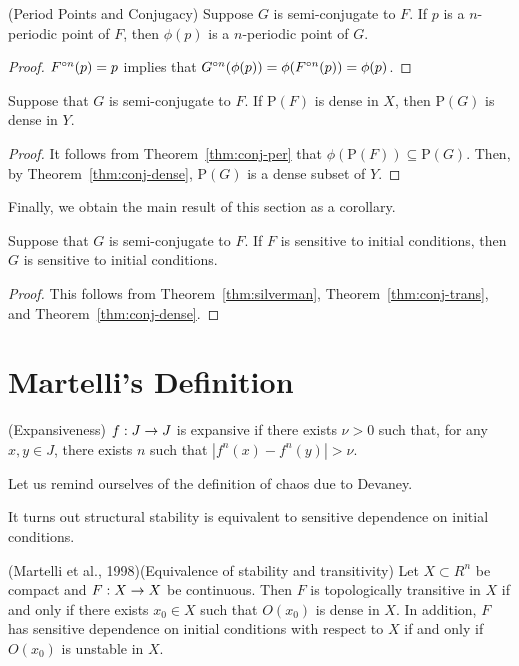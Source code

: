 \documentclass[12pt,draft,twoside]{book}
\begin{document}
  \begin{lemma}
    (Period Points and Conjugacy)
    Suppose $G$ is semi-conjugate to $F$.
    If $p$ is a $n$-periodic point of $F$, then $\phi(p)$ is a $n$-periodic point of $G$.
    \label{thm:conj-per}
    \begin{proof}
      $F^{\circ n}(p) = p$ implies that $G^{\circ n}(\phi(p)) = \phi(F^{\circ n}(p)) = \phi(p)$.
    \end{proof}
  \end{lemma}
\begin{theorem}
    Suppose that $G$ is semi-conjugate to $F$.
    If $\mathrm{P}(F)$ is dense in $X$, then $\mathrm{P}(G)$ is dense in $Y$.
    \label{cor:conj-dense-per}
    \begin{proof}
      It follows from Theorem~\ref{thm:conj-per} that $\phi(\mathrm{P}(F)) \subseteq \mathrm{P}(G)$.
      Then, by Theorem~\ref{thm:conj-dense}, $\mathrm{P}(G)$ is a dense subset of $Y$.
    \end{proof}
\end{theorem}
Finally, we obtain the main result of this section as a corollary.
\begin{corollary}
  Suppose that $G$ is semi-conjugate to $F$.
  If $F$ is sensitive to initial conditions, then $G$ is sensitive to initial conditions.
  \label{cor:conj-sdic}
  \begin{proof}
  This follows from Theorem~\ref{thm:silverman}, Theorem~\ref{thm:conj-trans}, and Theorem~\ref{thm:conj-dense}.
  \end{proof}
\end{corollary}

\section{Martelli's Definition}

\begin{definition}
  (Expansiveness) $f: J\rightarrow J$ is expansive if there exists $\nu > 0$
  such that, for any $x,y\in J$, there exists $n$ such that
  $|f^{n}(x)-f^{n}(y)| > \nu$.
\end{definition}

Let us remind ourselves of the definition of chaos due to Devaney.

It turns out structural stability is equivalent to sensitive dependence on initial conditions.
\begin{proposition}
  (Martelli et al., 1998)(Equivalence of stability and transitivity)
  Let $X\subset R^n$ be compact and $F: X\rightarrow X$ be continuous.
  Then $F$ is topologically transitive in $X$ if and only if there exists $x_0\in X$ such that $O(x_0)$ is dense in $X$.
  In addition, $F$ has sensitive dependence on initial conditions with respect to $X$ if and only if $O(x_0)$ is unstable in $X$.
\end{proposition}
\end{document}
